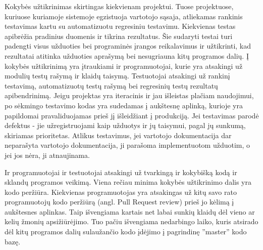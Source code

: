 \documentclass{VUMIFPSkursinis}
\begin{document}
	Kokybės užtikrinimas skirtingas kiekvienam projektui.
	Tuose projektuose, kuriuose kuriamoje sistemoje egzistuoja vartotojo sąsaja, atliekamas rankinis testavimas kartu su automatizuotu regresiniu testavimu. Kiekvienas testas apibrėžia pradinius duomenis ir tikrina rezultatus. Šie sudaryti testai turi padengti visus užduoties bei programinės įrangos reikalavimus ir užtikrinti, kad rezultatai atitinka užduoties aprašymą bei nesugriauna kitų programos dalių.
	Į kokybės užtikrinimą yra įtraukiami ir programuotojai, kurie yra atsakingi už modulių testų rašymą ir klaidų taisymą.
	Testuotojai atsakingi už rankinį testavimą, automatizuotų testų rašymą bei regresinių testų rezultatų apibendrinimą.
	Jeigu projektas yra iteracinis ir jau išleistas plačiam naudojimui, po sėkmingo testavimo kodas yra sudedamas į aukštesnę aplinką, kurioje yra papildomai pravaliduojamas prieš jį išleidžiant į produkciją.
	Jei testavimas parodė defektus - jie užregistruojami kaip užduotys ir jų taisymui, pagal jų sunkumą, skiriamas prioritetas. 
Atlikus testavimus, jei vartotojo dokumentacija dar neparašyta vartotojo dokumentacija, ji parašoma implementuotom užduotim, o jei jos nėra, ji atnaujinama.
	\par
	Ir programuotojai ir testuotojai atsakingi už tvarkingą ir kokybišką kodą ir sklandų programos veikimą.
	Viena rečiau minima kokybės užtikrinimo dalis yra kodo peržiūra.
	Kiekvienas programuotojas yra atsakingas už kitų savo rato programuotojų kodo peržiūrą (angl. Pull Request review) prieš jo kėlimą į aukštesnes aplinkas.
	Taip išvengiama kartais net labai sunkių klaidų dėl vieno ar kelių žmonių apsižiūrėjimo.
	Tuo pačiu išvengiama nedarbingo laiko, kuris atsirado dėl kitų programos dalių sulaužančio kodo įdėjimo į pagrindinę ''master'' kodo bazę.

	\newpage
	
\end{document}

